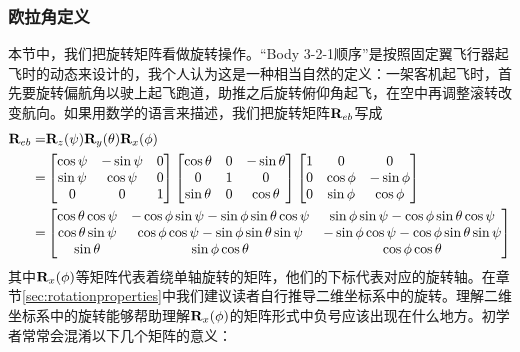 \documentclass[11pt]{article}
\begin{document}
\subsubsection{欧拉角定义}
本节中，我们把旋转矩阵看做旋转操作。“Body 3-2-1顺序”是按照固定翼飞行器起飞时的动态来设计的，我个人认为这是一种相当自然的定义：一架客机起飞时，首先要旋转偏航角以驶上起飞跑道，助推之后旋转俯仰角起飞，在空中再调整滚转改变航向。如果用数学的语言来描述，我们把旋转矩阵${\bf R}_{eb}$写成
\begin{align}
{\bf R}_{eb} = &  {\bf R}_z(\psi){\bf R}_y(\theta){\bf R}_x(\phi) \\
\label{eqn:eulerparts}	= & 
\begin{bmatrix}
\cos\psi & - \sin\psi & 0\\
\sin\psi & \cos\psi & 0\\
0 & 0 & 1
\end{bmatrix}
\begin{bmatrix}
\cos\theta & 0 & -\sin\theta\\
0 & 1 & 0\\
\sin\theta & 0 & \cos\theta \\
\end{bmatrix}
\begin{bmatrix}
1 & 0 & 0 \\
0 & \cos\phi & -\sin\phi \\
0 & \sin\phi & \cos\phi 
\end{bmatrix}\\
\label{eqn:euler}= &
\begin{bmatrix}
\cos\theta\cos\psi & -\cos\phi\sin\psi - \sin\phi\sin\theta\cos\psi & \sin\phi\sin\psi-\cos\phi\sin\theta\cos\psi \\
\cos\theta\sin\psi & \cos\phi\cos\psi - \sin\phi\sin\theta\sin\psi & -\sin\phi\cos\psi-\cos\phi\sin\theta\sin\psi \\
\sin\theta        &  \sin\phi\cos\theta                            & \cos\phi\cos\theta 
\end{bmatrix} 
\end{align}
其中${\bf R}_x(\phi)$等矩阵代表着绕单轴旋转的矩阵，他们的下标代表对应的旋转轴。在章节\ref{sec:rotationproperties}中我们建议读者自行推导二维坐标系中的旋转。理解二维坐标系中的旋转能够帮助理解${\bf R}_x(\phi)$的矩阵形式中负号应该出现在什么地方。初学者常常会混淆以下几个矩阵的意义：
\end{document}

